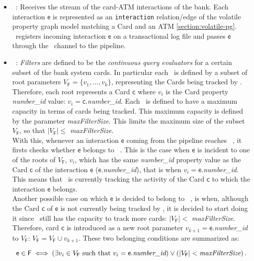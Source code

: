 \begin{itemize}
    \item \source\ \Sr: Receives the stream of the card-ATM interactions of the bank. Each interaction $\mathsf{e}$ is represented as an \texttt{interaction} relation/edge of the volatile property graph model matching a Card and an ATM \ref{section:volatile-pg}. \Sr\ registers incoming interaction $\mathsf{e}$ on a transactional log file and passes $\mathsf{e}$ through the \eventch\ channel to the pipeline.
    \item \filter\ \F: \emph{Filters} are defined to be the \textit{continuous query evaluators} for a certain subset of the bank system cards. In particular each \F\ is defined by a subset of root parameters $V_{\mathsf{F}} = \{v_1,\ldots,v_k\}$, representing the Cards being tracked by \F. Therefore, each root represents a Card $\mathsf{c}$ where $v_i$ is the Card property \emph{number\_id} value: $v_i = \mathsf{c}$.\emph{number\_id}. Each \filter\ is defined to have a maximum capacity in terms of cards being tracked. This maximum capacity is defined by the parameter \emph{maxFilterSize}. This limits the maximum size of the subset $V_{\mathsf{F}}$, so that $|V_{\mathsf{F}}| \leq $ \emph{maxFilterSize}.\\

    With this, whenever an interaction $\mathsf{e}$ coming from the pipeline reaches \filter\ \F, it firsts checks whether $\mathsf{e}$ belongs to \filter\ \F. This is the case when $\mathsf{e}$ is incident to one of the roots of $V_{\mathsf{F}}$, $v_i$, which has the same \emph{number\_id} property value as the Card $\mathsf{c}$ of the interaction $\mathsf{e}$ ($\mathsf{e}$.\emph{number\_id}), that is when $v_i =\mathsf{e}$.\emph{number\_id}. This means that \F\ is currently tracking the activity of the Card $\mathsf{c}$ to which the interaction $\mathsf{e}$ belongs.\\ 
    
    Another possible case on which $\mathsf{e}$ is decided to belong to \filter\ \F, is when, although the Card $\mathsf{c}$ of $\mathsf{e}$ is not currently being tracked by \F, it is decided to start doing it since \F\ still has the capacity to track more cards: $|V_{\mathsf{F}}| < $ \emph{maxFilterSize}. Therefore, card $\mathsf{c}$ is introduced as a new root parameter $v_{k+1} = \mathsf{e}$.\emph{number\_id} to $V_{\mathsf{F}}$: $V_{\mathsf{F}} = V_{\mathsf{F}} \cup v_{k+1}$. These two belonging conditions are summarized as:
    
    $$
    \mathsf{e} \in \mathsf{F} \iff 
    \left(\exists v_i \in V_{\mathsf{F}} \text{ such that } v_i = \mathsf{e}.\emph{number\_id} \right) 
    \lor \left(|V_{\mathsf{F}}| < \emph{maxFilterSize}\right).
    $$


\end{itemize}
